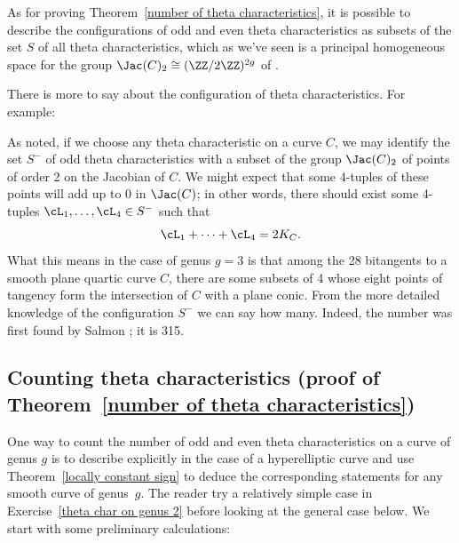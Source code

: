 As for proving Theorem~\ref{number of theta characteristics}, it
is possible to describe the configurations of odd and even theta
characteristics as subsets of the set $S$ of all theta characteristics,
which as we've seen is a principal
homogeneous space for the group
$\Jac(C)_2 \cong (\ZZ/2\ZZ)^{2g}$ of
%
\cite{JHPaper}.

There is more to say about the configuration of theta characteristics. For
example:
\begin{fact}
 As noted, if we choose any theta characteristic on a curve $C$, we may
 identify the set $S^-$ of odd theta characteristics with a subset of the
 group $\Jac(C)_2$ of points of order 2 on the Jacobian of $C$. We might
 expect that some 4-tuples of these points will add up to 0 in $\Jac(C)$;
 in other words, there should exist some 4-tuples $\cL_1,\dots,\cL_4
 \in S^-$ such that
$$
\cL_1+ \dots +\cL_4 = 2K_C.
$$
What this means in the case of genus $g=3$ is that among the 28 bitangents
%
to a smooth plane quartic curve $C$, there are some subsets of 4 whose
eight points of tangency form the intersection of $C$ with a plane
conic. From the more detailed knowledge of the configuration $S^-$
we can say how many. Indeed, the number was first found by Salmon
%
\citeyear{MR0115124};
it is 315.
\end{fact}

\subsection*{Counting theta characteristics (proof of Theorem~\ref{number of theta characteristics})}

One
way to count the number of odd and even theta characteristics on
\label{theta characteristic count} %
a curve of genus $g$ is  to describe
explicitly in the case of
a hyperelliptic curve and
use Theorem~\ref{locally constant sign}
to deduce the corresponding statements for any smooth curve of genus~$g$.
The reader
try a relatively simple case in
Exercise~\ref{theta char on genus 2} before looking at the general
case below.
We start with some preliminary calculations:

